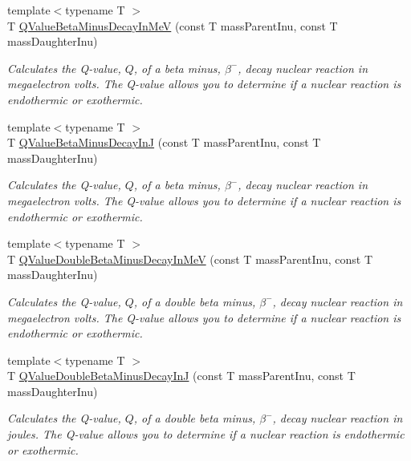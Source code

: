 \begin{DoxyCompactItemize}
{\footnotesize template$<$typename T $>$ }\\T \mbox{\hyperlink{group___e_g_x_phys-_q_value-_beta_minus_gaac1374ce9ba39bef416f34298708bda9}{Q\+Value\+Beta\+Minus\+Decay\+In\+MeV}} (const T mass\+Parent\+Inu, const T mass\+Daughter\+Inu)
\begin{DoxyCompactList}\small\item\em Calculates the Q-\/value, $Q$, of a beta minus, $\beta^-$, decay nuclear reaction in megaelectron volts. The Q-\/value allows you to determine if a nuclear reaction is endothermic or exothermic. \end{DoxyCompactList}\item 
{\footnotesize template$<$typename T $>$ }\\T \mbox{\hyperlink{group___e_g_x_phys-_q_value-_beta_minus_gae9a4a9f4c6e0f555e20c3144dd7329fc}{Q\+Value\+Beta\+Minus\+Decay\+InJ}} (const T mass\+Parent\+Inu, const T mass\+Daughter\+Inu)
\begin{DoxyCompactList}\small\item\em Calculates the Q-\/value, $Q$, of a beta minus, $\beta^-$, decay nuclear reaction in megaelectron volts. The Q-\/value allows you to determine if a nuclear reaction is endothermic or exothermic. \end{DoxyCompactList}\item 
{\footnotesize template$<$typename T $>$ }\\T \mbox{\hyperlink{group___e_g_x_phys-_q_value-_beta_minus_ga2678563115405a056c6bdccc9f2a9232}{Q\+Value\+Double\+Beta\+Minus\+Decay\+In\+MeV}} (const T mass\+Parent\+Inu, const T mass\+Daughter\+Inu)
\begin{DoxyCompactList}\small\item\em Calculates the Q-\/value, $Q$, of a double beta minus, $\beta^-$, decay nuclear reaction in megaelectron volts. The Q-\/value allows you to determine if a nuclear reaction is endothermic or exothermic. \end{DoxyCompactList}\item 
{\footnotesize template$<$typename T $>$ }\\T \mbox{\hyperlink{group___e_g_x_phys-_q_value-_beta_minus_ga5be6923812a1a701ed38965329dd6297}{Q\+Value\+Double\+Beta\+Minus\+Decay\+InJ}} (const T mass\+Parent\+Inu, const T mass\+Daughter\+Inu)
\begin{DoxyCompactList}\small\item\em Calculates the Q-\/value, $Q$, of a double beta minus, $\beta^-$, decay nuclear reaction in joules. The Q-\/value allows you to determine if a nuclear reaction is endothermic or exothermic. \end{DoxyCompactList}\item 

\end{DoxyCompactItemize}
